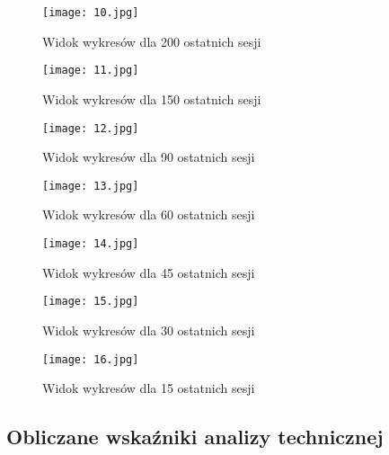 \begin{figure}[H]
	\centering
	\texttt{[image: 10.jpg]}
	\caption{Widok wykresów dla 200 ostatnich sesji}
	\label{fig:10}
\end{figure}

\begin{figure}[H]
	\centering
	\texttt{[image: 11.jpg]}
	\caption{Widok wykresów dla 150 ostatnich sesji}
	\label{fig:11}
\end{figure}

\begin{figure}[H]
	\centering
	\texttt{[image: 12.jpg]}
	\caption{Widok wykresów dla 90 ostatnich sesji}
	\label{fig:12}
\end{figure}

\begin{figure}[H]
	\centering
	\texttt{[image: 13.jpg]}
	\caption{Widok wykresów dla 60 ostatnich sesji}
	\label{fig:13}
\end{figure}

\begin{figure}[H]
	\centering
	\texttt{[image: 14.jpg]}
	\caption{Widok wykresów dla 45 ostatnich sesji}
	\label{fig:14}
\end{figure}

\begin{figure}[H]
	\centering
	\texttt{[image: 15.jpg]}
	\caption{Widok wykresów dla 30 ostatnich sesji}
	\label{fig:15}
\end{figure}

\begin{figure}[H]
	\centering
	\texttt{[image: 16.jpg]}
	\caption{Widok wykresów dla 15 ostatnich sesji}
	\label{fig:16}
\end{figure}

\subsection{Obliczane wskaźniki analizy technicznej}

